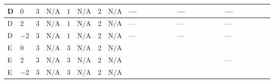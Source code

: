 \documentclass[8pt]{article}
\begin{document}
\begin{landscape}
\begin{longtable}{@{}llcccccc >{\raggedright\arraybackslash}p{0.21\linewidth} >{\raggedright\arraybackslash}p{0.21\linewidth} >{\raggedright\arraybackslash}p{0.21\linewidth}@{}}
\midrule
D & $0$ & $3$ & $\text{N/A}$ & $1$ & $\text{N/A}$ & $2$ & $\text{N/A}$ & --- & --- & --- \\
\midrule
D & $2$ & $3$ & $\text{N/A}$ & $1$ & $\text{N/A}$ & $2$ & $\text{N/A}$ & --- & --- & --- \\
\midrule
D & $-2$ & $3$ & $\text{N/A}$ & $1$ & $\text{N/A}$ & $2$ & $\text{N/A}$ & --- & --- & --- \\
\midrule
E & $0$ & $3$ & $\text{N/A}$ & $3$ & $\text{N/A}$ & $2$ & $\text{N/A}$ & \scriptsize\adjustbox{max width=\linewidth}{$\begin{gathered} {\lambda_{HS_2}^{(A)}} (6 \operatorname{Tr}\!\left({Y_d}\,\left({Y_d}\right)^{\dagger}\right)+2 \operatorname{Tr}\!\left({Y_e}\,\left({Y_e}\right)^{\dagger}\right)+6 \operatorname{Tr}\!\left({Y_u}\,\left({Y_u}\right)^{\dagger}\right)+16 {\lambda_{S_2}^{(A)}})\end{gathered}$} & \scriptsize\adjustbox{max width=\linewidth}{$\begin{gathered} -\frac{8}{9} {\lambda_5} \left({\lambda_5}\right)^{*}\end{gathered}$} & \scriptsize\adjustbox{max width=\linewidth}{$\begin{gathered} -\frac{8}{9} {\lambda_{X_{14}}} \left({\lambda_{X_{14}}}\right)^{*}\end{gathered}$} \\
\midrule
E & $2$ & $3$ & $\text{N/A}$ & $3$ & $\text{N/A}$ & $2$ & $\text{N/A}$ & \scriptsize\adjustbox{max width=\linewidth}{$\begin{gathered} {\lambda_{HS_2}^{(A)}} (6 \operatorname{Tr}\!\left({Y_d}\,\left({Y_d}\right)^{\dagger}\right)+2 \operatorname{Tr}\!\left({Y_e}\,\left({Y_e}\right)^{\dagger}\right)+6 \operatorname{Tr}\!\left({Y_u}\,\left({Y_u}\right)^{\dagger}\right)+16 {\lambda_{S_2}^{(A)}})\end{gathered}$} & \scriptsize\adjustbox{max width=\linewidth}{$\begin{gathered} -\frac{8}{9} {\lambda_5} \left({\lambda_5}\right)^{*}\end{gathered}$} & --- \\
\midrule
E & $-2$ & $3$ & $\text{N/A}$ & $3$ & $\text{N/A}$ & $2$ & $\text{N/A}$ & \scriptsize\adjustbox{max width=\linewidth}{$\begin{gathered} {\lambda_{HS_2}^{(A)}} (6 \operatorname{Tr}\!\left({Y_d}\,\left({Y_d}\right)^{\dagger}\right)+2 \operatorname{Tr}\!\left({Y_e}\,\left({Y_e}\right)^{\dagger}\right)+6 \operatorname{Tr}\!\left({Y_u}\,\left({Y_u}\right)^{\dagger}\right)+16 {\lambda_{S_2}^{(A)}})\end{gathered}$} & \scriptsize\adjustbox{max width=\linewidth}{$\begin{gathered} -\frac{8}{9} {\lambda_5} \left({\lambda_5}\right)^{*}\end{gathered}$} & \scriptsize\adjustbox{max width=\linewidth}{$\begin{gathered} -\frac{4}{3} {\lambda_{X_{12}}} \left({\lambda_{X_{12}}}\right)^{*}\end{gathered}$} \\

\end{longtable}
\end{landscape}
\end{document}
